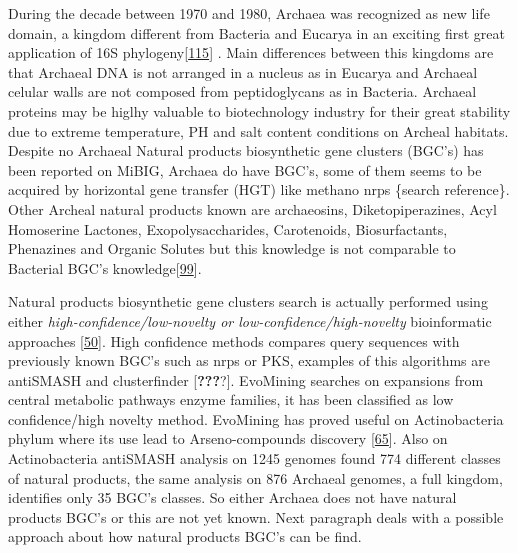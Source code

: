 \documentclass[12pt,twoside]{reedthesis}
\begin{document}
  During the decade between 1970 and 1980, Archaea was recognized as new
  life domain, a kingdom different from Bacteria and Eucarya in an
  exciting first great application of 16S
  phylogeny{[}\protect\hyperlink{ref-woeseux5fphylogeneticux5f1977}{115}{]}
  . Main differences between this kingdoms are that Archaeal DNA is not
  arranged in a nucleus as in Eucarya and Archaeal celular walls are not
  composed from peptidoglycans as in Bacteria. Archaeal proteins may be
  higlhy valuable to biotechnology industry for their great stability due
  to extreme temperature, PH and salt content conditions on Archeal
  habitats. Despite no Archaeal Natural products biosynthetic gene
  clusters (BGC's) has been reported on MiBIG, Archaea do have BGC's, some
  of them seems to be acquired by horizontal gene transfer (HGT) like
  methano nrps \{search reference\}. Other Archeal natural products known
  are archaeosins, Diketopiperazines, Acyl Homoserine Lactones,
  Exopolysaccharides, Carotenoids, Biosurfactants, Phenazines and Organic
  Solutes but this knowledge is not comparable to Bacterial BGC's
  knowledge{[}\protect\hyperlink{ref-charlesworthux5funtappedux5f2015}{99}{]}.
  
  Natural products biosynthetic gene clusters search is actually performed
  using either \emph{high-confidence/low-novelty or
  low-confidence/high-novelty} bioinformatic approaches
  {[}\protect\hyperlink{ref-medemaux5fcomputationalux5f2015}{50}{]}. High
  confidence methods compares query sequences with previously known BGC's
  such as nrps or PKS, examples of this algorithms are antiSMASH and
  clusterfinder {[}\textbf{???}?{]}. EvoMining searches on expansions from
  central metabolic pathways enzyme families, it has been classified as
  low confidence/high novelty method. EvoMining has proved useful on
  Actinobacteria phylum where its use lead to Arseno-compounds discovery
  {[}\protect\hyperlink{ref-cruz-moralesux5fphylogenomicux5f2016}{65}{]}.
  Also on Actinobacteria antiSMASH analysis on 1245 genomes found 774
  different classes of natural products, the same analysis on 876 Archaeal
  genomes, a full kingdom, identifies only 35 BGC's classes. So either
  Archaea does not have natural products BGC's or this are not yet known.
  Next paragraph deals with a possible approach about how natural products
  BGC's can be find.
  
\end{document}
